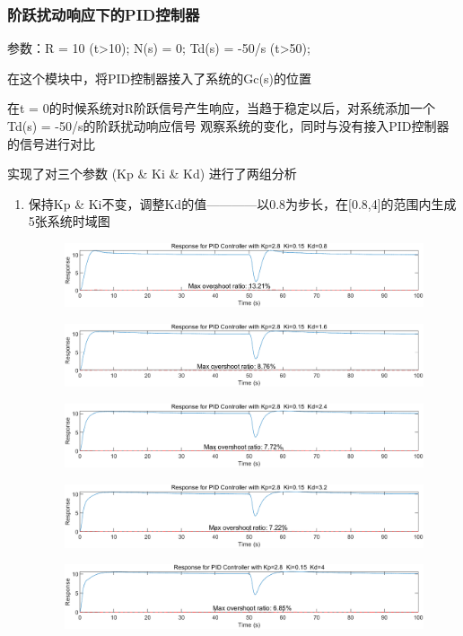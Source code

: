 \documentclass{thuemp}
\begin{document}
\subsubsection{阶跃扰动响应下的PID控制器}
参数：R = 10 (t>10);  N(s) = 0;  Td(s) = -50/s (t>50);

在这个模块中，将PID控制器接入了系统的Gc(s)的位置

在t = 0的时候系统对R阶跃信号产生响应，当趋于稳定以后，对系统添加一个Td(s) = -50/s的阶跃扰动响应信号
观察系统的变化，同时与没有接入PID控制器的信号进行对比

实现了对三个参数 (Kp \& Ki \& Kd) 进行了两组分析
\begin{enumerate}
  \item 保持Kp \& Ki不变，调整Kd的值————以0.8为步长，在[0.8,4]的范围内生成5张系统时域图
  \begin{figure}[H]
    \centering
    \includegraphics[width=1\linewidth]{./img/PID_with_noise/pi1.png}
  \end{figure}
  \begin{figure}[H]
    \centering
    \includegraphics[width=1\linewidth]{./img/PID_with_noise/pi2.png}
  \end{figure}
  \begin{figure}[H]
    \centering
    \includegraphics[width=1\linewidth]{./img/PID_with_noise/pi3.png}
  \end{figure}
  \begin{figure}[H]
    \centering
    \includegraphics[width=1\linewidth]{./img/PID_with_noise/pi4.png}
  \end{figure}
  \begin{figure}[H]
    \centering
    \includegraphics[width=1\linewidth]{./img/PID_with_noise/pi5.png}
  \end{figure}


\end{enumerate}
\end{document}

